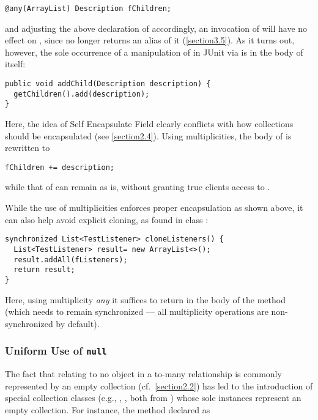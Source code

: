 {\begin{lstlisting}
@any(ArrayList) Description fChildren;
\end{lstlisting}

\noindent and adjusting the above declaration of 
accordingly, an invocation of
 will have no effect
on , since  no longer returns an alias
of it (\autoref{section3.5}). As it turns out, however, the sole occurrence of a
manipulation of  in JUnit via  is in the
body of  itself:

\begin{lstlisting}
public void addChild(Description description) {
  getChildren().add(description);
}
\end{lstlisting}

\noindent Here, the idea of Self Encapsulate Field \cite{ref16} clearly conflicts
with how collections should be encapsulated (see \autoref{section2.4}). Using
multiplicities, the body of  is rewritten to

\begin{lstlisting}
fChildren += description;
\end{lstlisting}

\noindent while that of  can remain as is, without
granting true clients access to .

While the use of multiplicities enforces proper encapsulation as shown
above, it can also help avoid explicit cloning, as found in class
:

\begin{lstlisting}
synchronized List<TestListener> cloneListeners() {
  List<TestListener> result= new ArrayList<>();
  result.addAll(fListeners);
  return result;
}
\end{lstlisting}

\noindent Here, using multiplicity \emph{any} it suffices to return
 in the body of the method (which needs to remain
synchronized --- all multiplicity operations are non-synchronized by default).

\subsubsection{Uniform Use of \texttt{null}}
\label{section6.1.5}

\noindent The fact that relating to no object in a to-many relationship is commonly
represented by an empty collection (cf.~\autoref{section2.2}) has led to the
introduction of special collection classes (e.g.,
, , both from
) whose sole instances represent an empty collection. For
instance, the method declared as

}
